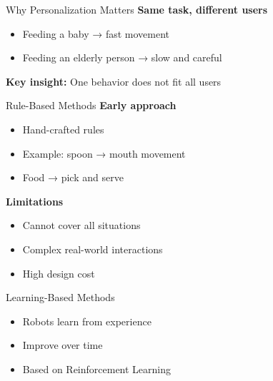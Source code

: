 \documentclass[aspectratio=169,10pt]{beamer}
\begin{document}
\begin{frame}{Why Personalization Matters}
\footnotesize
\textbf{Same task, different users}

\begin{itemize}\footnotesize
    \item Feeding a baby → fast movement
    \item Feeding an elderly person → slow and careful
\end{itemize}

\vspace{0.5em}
\textbf{Key insight:} One behavior does not fit all users
\end{frame}

\begin{frame}{Rule-Based Methods}
\footnotesize
\textbf{Early approach}

\begin{itemize}\footnotesize
    \item Hand-crafted rules
    \item Example: spoon → mouth movement
    \item Food → pick and serve
\end{itemize}

\vspace{0.5em}
\textbf{Limitations}
\begin{itemize}\footnotesize
    \item Cannot cover all situations
    \item Complex real-world interactions
    \item High design cost
\end{itemize}
\end{frame}

\begin{frame}{Learning-Based Methods}
\footnotesize
\begin{itemize}\footnotesize
    \item Robots learn from experience
    \item Improve over time
    \item Based on Reinforcement Learning
\end{itemize}
\end{frame}
\end{document}
